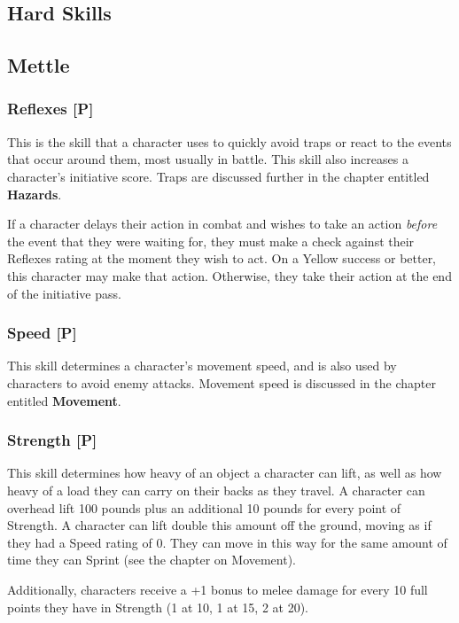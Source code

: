 \documentclass[oneside]{book}
\begin{document}
\begin{multicols}{2}

\section{Hard Skills}
\subsection{Mettle}
\subsubsection{Reflexes [P]}
This is the skill that a character uses to quickly avoid traps or react to the events that occur around them, most usually in battle. This skill also increases a character's initiative score. Traps are discussed further in the chapter entitled \textbf{Hazards}.

If a character delays their action in combat and wishes to take an action \emph{before} the event that they were waiting for, they must make a check against their Reflexes rating at the moment they wish to act. On a Yellow success or better, this character may make that action. Otherwise, they take their action at the end of the initiative pass.

\subsubsection{Speed [P]}
This skill determines a character's movement speed, and is also used by characters to avoid enemy attacks. Movement speed is discussed in the chapter entitled \textbf{Movement}.

\subsubsection{Strength [P]}
This skill determines how heavy of an object a character can lift, as well as how heavy of a load they can carry on their backs as they travel. A character can overhead lift 100 pounds plus an additional 10 pounds for every point of Strength. A character can lift double this amount off the ground, moving as if they had a Speed rating of 0. They can move in this way for the same amount of time they can Sprint (see the chapter on Movement).

Additionally, characters receive a +1 bonus to melee damage for every 10 full points they have in Strength (1 at 10, 1 at 15, 2 at 20).


\end{multicols}
\end{document}
